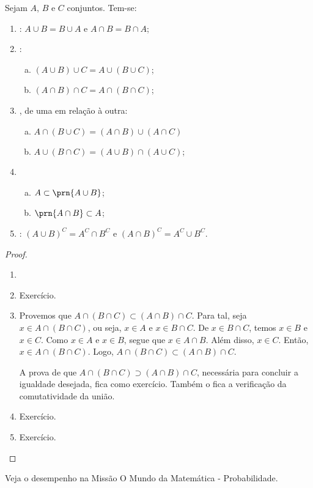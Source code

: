 \begin{proposition}
\label{prop:uniao-e-intersecao}
Sejam $A$, $B$ e $C$ conjuntos. Tem-se:
\begin{enumerate}[1.]
\item {}: $A \cup B = B \cup A$ e $A \cap B = B \cap A$;
\item {}:
	\begin{enumerate}[a)]
	\item $\left(A \cup B \right) \cup C = A \cup \left( B \cup C \right)$;
	\item $\left(A \cap B \right) \cap C = A \cap \left( B \cap C \right)$;
	\end{enumerate}
\item {}, de uma em relação à outra:
	\begin{enumerate}[a)]
		\item $A \cap \left( B \cup C \right) = \left(A \cap B \right) \cup \left( A \cap C \right)$
		\item $A \cup \left( B \cap C \right) = \left(A \cup B \right) \cap \left( A \cup C  \right)$;
	\end{enumerate}
\item %
	\begin{enumerate}[a)]
		\item $A \subset \prn{A \cup B}$;
		\item $\prn{A \cap B} \subset A$;
	\end{enumerate}
\item
	:
	$\left( A \cup B \right)^C = A^C \cap B^C$ e $\left(A \cap B \right)^C = A^C \cup B^C$.
\end{enumerate}
\end{proposition}

\begin{proof}
\begin{enumerate}
\item[]
\item Exercício.
\item
Provemos que $A \cap (B \cap C) \subset (A \cap B) \cap C$.
Para tal, seja $x \in A \cap (B \cap C)$, ou seja, $x \in A$ e $x \in B \cap C$.
De $x \in B \cap C$, temos $x \in B$ e $x \in C$.
Como $x \in A$ e $x \in B$, segue que $x \in A \cap B$.
Além disso, $x \in C$.
Então, $x \in A \cap (B \cap C)$.
Logo, $A \cap (B \cap C) \subset (A \cap B) \cap C$. 

A prova de que $A \cap (B \cap C) \supset (A \cap B) \cap C$, necessária para concluir a igualdade desejada, fica como exercício. Também o fica a verificação da comutatividade da união.
\item Exercício.
\item Exercício.
\end{enumerate}
\end{proof}

\begin{onlineact}
Veja o desempenho na Missão O Mundo da Matemática - Probabilidade.
\end{onlineact}


